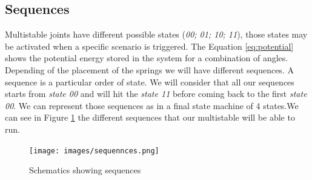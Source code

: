     \subsection{Sequences}\label{sec:sequences}
        Multistable joints have different possible states (\textit{00; 01; 10; 11}), those states may be activated when a specific scenario is triggered. The Equation \ref{eq:potential} shows the potential energy stored in the system for a combination of angles. Depending of the placement of the springs we will have different sequences. A sequence is a particular order of state. We will consider that all our sequences starts from \textit{state 00} and will hit the \textit{state 11} before coming back to the first \textit{state 00}. We can represent those sequences as in a final state machine of 4 states.We can see in Figure \ref{fig:sequences} the different sequences that our multistable will be able to run. 
        
        \begin{figure}
            \centering
            \texttt{[image: images/sequennces.png]}
            \caption{Schematics showing sequences}
            \label{fig:sequences}
        \end{figure}
        
        
    